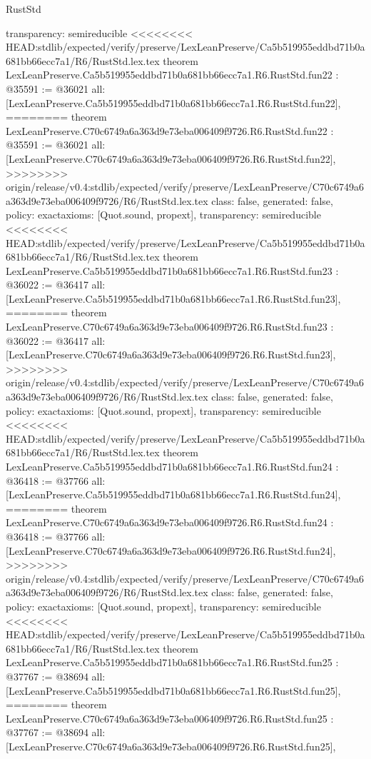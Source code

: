 \begin{lexlean}{RustStd}
\begin{coremodule}
{\begin{coremodule}
{{{{{{{{{{{{{{{{{{{{{{{{{  transparency: semireducible
}
<<<<<<<< HEAD:stdlib/expected/verify/preserve/LexLeanPreserve/Ca5b519955eddbd71b0a681bb66ecc7a1/R6/RustStd.lex.tex
theorem LexLeanPreserve.Ca5b519955eddbd71b0a681bb66ecc7a1.R6.RustStd.fun22 : @35591 := @36021 {
  all: [LexLeanPreserve.Ca5b519955eddbd71b0a681bb66ecc7a1.R6.RustStd.fun22],
========
theorem LexLeanPreserve.C70c6749a6a363d9e73eba006409f9726.R6.RustStd.fun22 : @35591 := @36021 {
  all: [LexLeanPreserve.C70c6749a6a363d9e73eba006409f9726.R6.RustStd.fun22],
>>>>>>>> origin/release/v0.4:stdlib/expected/verify/preserve/LexLeanPreserve/C70c6749a6a363d9e73eba006409f9726/R6/RustStd.lex.tex
  class: false,
  generated: false,
  policy: exact{axioms: [Quot.sound, propext]},
  transparency: semireducible
}
<<<<<<<< HEAD:stdlib/expected/verify/preserve/LexLeanPreserve/Ca5b519955eddbd71b0a681bb66ecc7a1/R6/RustStd.lex.tex
theorem LexLeanPreserve.Ca5b519955eddbd71b0a681bb66ecc7a1.R6.RustStd.fun23 : @36022 := @36417 {
  all: [LexLeanPreserve.Ca5b519955eddbd71b0a681bb66ecc7a1.R6.RustStd.fun23],
========
theorem LexLeanPreserve.C70c6749a6a363d9e73eba006409f9726.R6.RustStd.fun23 : @36022 := @36417 {
  all: [LexLeanPreserve.C70c6749a6a363d9e73eba006409f9726.R6.RustStd.fun23],
>>>>>>>> origin/release/v0.4:stdlib/expected/verify/preserve/LexLeanPreserve/C70c6749a6a363d9e73eba006409f9726/R6/RustStd.lex.tex
  class: false,
  generated: false,
  policy: exact{axioms: [Quot.sound, propext]},
  transparency: semireducible
}
<<<<<<<< HEAD:stdlib/expected/verify/preserve/LexLeanPreserve/Ca5b519955eddbd71b0a681bb66ecc7a1/R6/RustStd.lex.tex
theorem LexLeanPreserve.Ca5b519955eddbd71b0a681bb66ecc7a1.R6.RustStd.fun24 : @36418 := @37766 {
  all: [LexLeanPreserve.Ca5b519955eddbd71b0a681bb66ecc7a1.R6.RustStd.fun24],
========
theorem LexLeanPreserve.C70c6749a6a363d9e73eba006409f9726.R6.RustStd.fun24 : @36418 := @37766 {
  all: [LexLeanPreserve.C70c6749a6a363d9e73eba006409f9726.R6.RustStd.fun24],
>>>>>>>> origin/release/v0.4:stdlib/expected/verify/preserve/LexLeanPreserve/C70c6749a6a363d9e73eba006409f9726/R6/RustStd.lex.tex
  class: false,
  generated: false,
  policy: exact{axioms: [Quot.sound, propext]},
  transparency: semireducible
}
<<<<<<<< HEAD:stdlib/expected/verify/preserve/LexLeanPreserve/Ca5b519955eddbd71b0a681bb66ecc7a1/R6/RustStd.lex.tex
theorem LexLeanPreserve.Ca5b519955eddbd71b0a681bb66ecc7a1.R6.RustStd.fun25 : @37767 := @38694 {
  all: [LexLeanPreserve.Ca5b519955eddbd71b0a681bb66ecc7a1.R6.RustStd.fun25],
========
theorem LexLeanPreserve.C70c6749a6a363d9e73eba006409f9726.R6.RustStd.fun25 : @37767 := @38694 {
  all: [LexLeanPreserve.C70c6749a6a363d9e73eba006409f9726.R6.RustStd.fun25],
}}}}}}}}}}}}}}}}}}}}}}}}}}}}}
\end{coremodule}}
\end{coremodule}
\end{lexlean}
